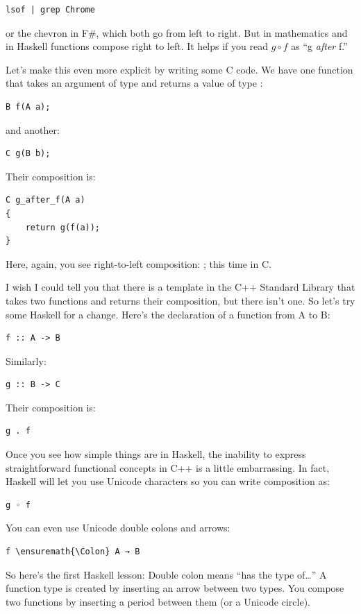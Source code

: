 \begin{Verbatim}
lsof | grep Chrome
\end{Verbatim}
or the chevron \code{>>} in F\#, which both
go from left to right. But in mathematics and in Haskell functions
compose right to left. It helps if you read \(g \circ f\) as ``g \emph{after} f.''

Let's make this even more explicit by writing some C code. We have one
function  that takes an argument of type  and
returns a value of type :

\begin{Verbatim}
B f(A a);
\end{Verbatim}
and another:

\begin{Verbatim}
C g(B b);
\end{Verbatim}
Their composition is:

\begin{Verbatim}
C g_after_f(A a)
{
    return g(f(a));
}
\end{Verbatim}
Here, again, you see right-to-left composition: ; this
time in C.

I wish I could tell you that there is a template in the C++ Standard
Library that takes two functions and returns their composition, but
there isn't one. So let's try some Haskell for a change. Here's the
declaration of a function from A to B:

\begin{Verbatim}
f :: A -> B
\end{Verbatim}
Similarly:

\begin{Verbatim}
g :: B -> C
\end{Verbatim}
Their composition is:

\begin{Verbatim}
g . f
\end{Verbatim}
Once you see how simple things are in Haskell, the inability to express
straightforward functional concepts in C++ is a little embarrassing. In
fact, Haskell will let you use Unicode characters so you can write
composition as:

\begin{Verbatim}
g ◦ f
\end{Verbatim}
You can even use Unicode double colons and arrows:

\begin{Verbatim}[commandchars=\\\{\}]
f \ensuremath{\Colon} A → B
\end{Verbatim}
So here's the first Haskell lesson: Double colon means ``has the type
of\ldots{}'' A function type is created by inserting an arrow between
two types. You compose two functions by inserting a period between them
(or a Unicode circle).

